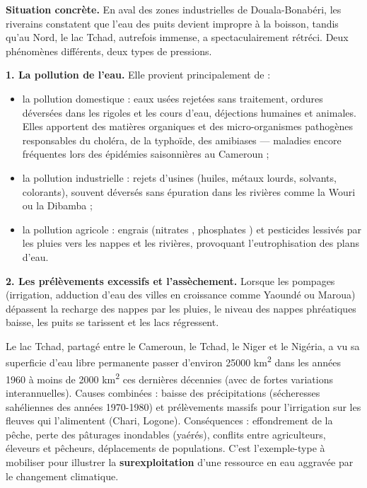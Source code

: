 \documentclass[11pt]{article}
\newcommand{\cle}[1]{{\popxbold\color{popdark}#1}}
\newcounter{popsec}
\newcounter{popsub}
\newcommand{\courssub}[1]{%
  \stepcounter{popsub}%
  \par\vspace{9pt}\noindent{\popxbold\fontsize{11.5}{13}\selectfont\color{popink}{\color{poporange}\thepopsec.\thepopsub}\hspace{6pt}#1}\par\nopagebreak\vspace{4pt}
}
\begin{document}
\courssub{Les pressions sur la ressource en eau}

\textbf{Situation concrète.} En aval des zones industrielles de Douala-Bonabéri, les riverains constatent que l'eau des puits devient impropre à la boisson, tandis qu'au Nord, le lac Tchad, autrefois immense, a spectaculairement rétréci. Deux phénomènes différents, deux types de pressions.

\textbf{1. La pollution de l'eau.} Elle provient principalement de :
\begin{itemize}
  \item la \cle{pollution domestique} : eaux usées rejetées sans traitement, ordures déversées dans les rigoles et les cours d'eau, déjections humaines et animales. Elles apportent des matières organiques et des micro-organismes pathogènes responsables du choléra, de la typhoïde, des amibiases — maladies encore fréquentes lors des épidémies saisonnières au Cameroun ;
  \item la \cle{pollution industrielle} : rejets d'usines (huiles, métaux lourds, solvants, colorants), souvent déversés sans épuration dans les rivières comme la Wouri ou la Dibamba ;
  \item la \cle{pollution agricole} : engrais (nitrates , phosphates ) et pesticides lessivés par les pluies vers les nappes et les rivières, provoquant l'eutrophisation des plans d'eau.
\end{itemize}

\textbf{2. Les prélèvements excessifs et l'assèchement.} Lorsque les pompages (irrigation, adduction d'eau des villes en croissance comme Yaoundé ou Maroua) dépassent la recharge des nappes par les pluies, le niveau des nappes phréatiques baisse, les puits se tarissent et les lacs régressent.

\begin{exemplebox}
Le lac Tchad, partagé entre le Cameroun, le Tchad, le Niger et le Nigéria, a vu sa superficie d'eau libre permanente passer d'environ \num{25000} km\textsuperscript{2} dans les années 1960 à moins de \num{2000} km\textsuperscript{2} ces dernières décennies (avec de fortes variations interannuelles). Causes combinées : baisse des précipitations (sécheresses sahéliennes des années 1970-1980) et prélèvements massifs pour l'irrigation sur les fleuves qui l'alimentent (Chari, Logone). Conséquences : effondrement de la pêche, perte des pâturages inondables (yaérés), conflits entre agriculteurs, éleveurs et pêcheurs, déplacements de populations. C'est l'exemple-type à mobiliser pour illustrer la \textbf{surexploitation} d'une ressource en eau aggravée par le changement climatique.
\end{exemplebox}
\end{document}
